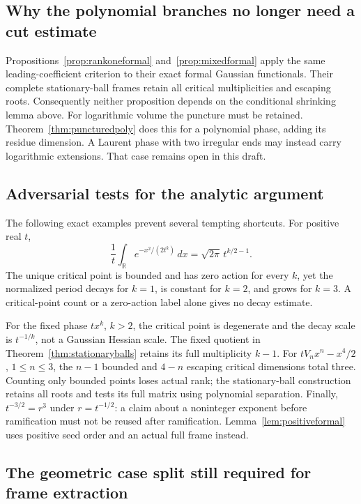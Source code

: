 \subsection{Why the polynomial branches no longer need a cut estimate}

Propositions~\ref{prop:rankoneformal} and~\ref{prop:mixedformal}
apply the same leading-coefficient criterion to their exact formal
Gaussian functionals. Their complete stationary-ball frames retain
all critical multiplicities and escaping roots. Consequently neither
proposition depends on the conditional shrinking lemma above.
For logarithmic volume the puncture must be retained. Theorem~\ref{thm:puncturedpoly}
does this for a polynomial phase, adding its residue dimension.
A Laurent phase with two irregular ends may instead carry logarithmic
extensions. That case remains open in this draft.

\subsection{Adversarial tests for the analytic argument}

The following exact examples prevent several tempting shortcuts.
For positive real $t$,
\[
 \frac1t\int_{\mathbb R}e^{-x^2/(2t^k)}\,dx
   =\sqrt{2\pi}\,t^{k/2-1}.
\]
The unique critical point is bounded and has zero action for every
$k$, yet the normalized period decays for $k=1$, is constant for
$k=2$, and grows for $k=3$. A critical-point count or a zero-action
label alone gives no decay estimate.

For the fixed phase $tx^k$, $k>2$, the critical point is degenerate
and the decay scale is $t^{-1/k}$, not a Gaussian Hessian scale.
The fixed quotient in Theorem~\ref{thm:stationaryballs}
retains its full multiplicity $k-1$.
For $tV_nx^n-x^4/2$, $1\leq n\leq3$, the $n-1$ bounded and
$4-n$ escaping critical dimensions total three. Counting only
bounded points loses actual rank; the stationary-ball construction
retains all roots and tests its full matrix using polynomial separation.
Finally, $t^{-3/2}=r^3$ under $r=t^{-1/2}$: a claim about a
noninteger exponent before ramification must not be reused after
ramification. Lemma~\ref{lem:positiveformal} uses positive seed order
and an actual full frame instead.

\subsection{The geometric case split still required for frame extraction}

